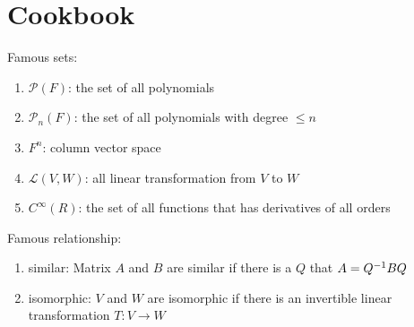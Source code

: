 \section{Cookbook}

Famous sets:
\begin{enumerate}
    \item $\mathcal{P}(F)$: the set of all polynomials
    \item $\mathcal{P}_n (F)$: the set of all polynomials with degree $\leq n$
    \item $F^n$: column vector space
    \item $\mathcal{L}(V,W)$: all linear transformation from $V$ to $W$
    \item $C^\infty (R)$: the set of all functions that has derivatives of all orders
\end{enumerate}

Famous relationship:
\begin{enumerate}
    \item similar: Matrix $A$ and $B$ are similar if there is a $Q$ that $A = {Q}^{-1} B Q$
    \item isomorphic: $V$ and $W$ are isomorphic if there is an invertible linear transformation $T:V \rightarrow W$
\end{enumerate}